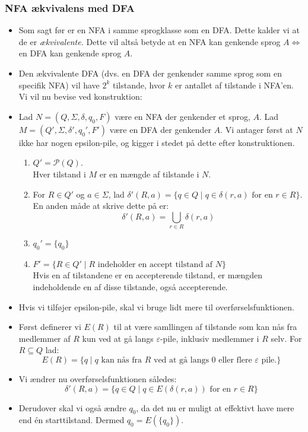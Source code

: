 \begin{frame}[allowframebreaks]
	\frametitle{NFA ækvivalens med DFA}
	\begin{itemize}
		\item Som sagt før er en NFA i samme sprogklasse som en DFA. Dette kalder vi at de er \textit{ækvivalente.} Dette vil altså betyde at en NFA kan genkende sprog $A \iff $ en DFA kan genkende sprog $A$.
		\item Den ækvivalente DFA (dvs. en DFA der genkender samme sprog som en specifik NFA) vil have $2^{k}$ tilstande, hvor $k$ er antallet af tilstande i NFA'en. Vi vil nu bevise ved konstruktion:
		\item Lad $N = (Q, \Sigma, \delta, q_{0}, F)$ være en NFA der genkender et sprog, $A$. Lad $M = (Q', \Sigma, \delta', q_{0}', F')$ være en DFA der genkender $A$. Vi antager først at $N$ ikke har nogen epsilon-pile, og kigger i stedet på dette efter konstruktionen.
		      \begin{enumerate}
			      \item $Q' = \mathcal{P}(Q)$. \\ Hver tilstand i $M$ er en mængde af tilstande i $N$.
			      \item For $R \in Q'$ og $a \in \Sigma$, lad $\delta'(R,a) = \{q \in Q \mid q \in \delta(r,a) \text{ for en } r \in R\}$. En anden måde at skrive dette på er:
			            \begin{equation*}
				            \delta'(R,a) = \bigcup_{r \in R} \delta(r,a)
			            \end{equation*}
			      \item $q_{0}' = \{q_{0}\}$
			      \item $F' = \{R \in Q' \mid R \text{ indeholder en accept tilstand af }N\}$  \\ Hvis en af tilstandene er en accepterende tilstand, er mængden indeholdende en af disse tilstande, også accepterende.
		      \end{enumerate}
		\item Hvis vi tilføjer epsilon-pile, skal vi bruge lidt mere til overførselsfunktionen.
		\item Først definerer vi $E(R)$ til at være samllingen af tilstande som kan nås fra medlemmer af $R$ kun ved at gå langs $\varepsilon$-pile, inklusiv medlemmer i $R$ selv. For $R \subseteq Q$ lad: \begin{equation*}
			      E(R) = \{q \mid q \text{ kan nås fra } R \text{ ved at gå langs 0 eller flere } \varepsilon \text{ pile.}\}
		      \end{equation*}
		\item Vi ændrer nu overførselsfunktionen således: \begin{equation*}
			      \delta' (R,a) = \{q \in Q \mid q \in E(\delta(r,a)) \text{ for en } r \in R\}
		      \end{equation*}
		\item Derudover skal vi også ændre $q_{0}$, da det nu er muligt at effektivt have mere end én starttilstand. Dermed $q_{0} = E(\{q_{0}\})$.
	\end{itemize}
\end{frame}

